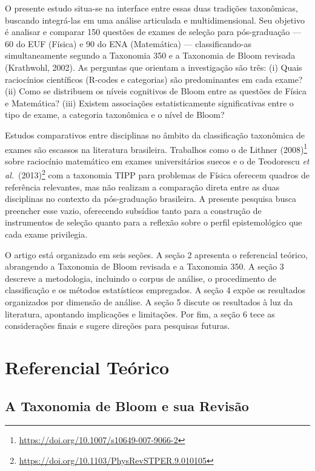 \documentclass[
  12pt,
  a4paper,
  twoside,
  brazilian
]{article}
\begin{document}
O presente estudo situa-se na interface entre essas duas tradições
taxonômicas, buscando integrá-las em uma análise articulada e
multidimensional. Seu objetivo é analisar e comparar 150 questões de
exames de seleção para pós-graduação --- 60 do EUF (Física) e 90 do ENA
(Matemática) --- classificando-as simultaneamente segundo a Taxonomia
350 e a Taxonomia de Bloom revisada (Krathwohl, 2002). As perguntas que
orientam a investigação são três: (i) Quais raciocínios científicos
(R-codes e categorias) são predominantes em cada exame? (ii) Como se
distribuem os níveis cognitivos de Bloom entre as questões de Física e
Matemática? (iii) Existem associações estatisticamente significativas
entre o tipo de exame, a categoria taxonômica e o nível de Bloom?

Estudos comparativos entre disciplinas no âmbito da classificação
taxonômica de exames são escassos na literatura brasileira. Trabalhos
como o de Lithner (2008)\footnote{\url{https://doi.org/10.1007/s10649-007-9066-2}} sobre raciocínio matemático em exames
universitários suecos e o de Teodorescu \textit{et al.}~(2013)\footnote{\url{https://doi.org/10.1103/PhysRevSTPER.9.010105}} com a taxonomia
TIPP para problemas de Física oferecem quadros de referência relevantes,
mas não realizam a comparação direta entre as duas disciplinas no
contexto da pós-graduação brasileira. A presente pesquisa busca
preencher esse vazio, oferecendo subsídios tanto para a construção de
instrumentos de seleção quanto para a reflexão sobre o perfil
epistemológico que cada exame privilegia.

O artigo está organizado em seis seções. A seção 2 apresenta o
referencial teórico, abrangendo a Taxonomia de Bloom revisada e a
Taxonomia 350. A seção 3 descreve a metodologia, incluindo o corpus de
análise, o procedimento de classificação e os métodos estatísticos
empregados. A seção 4 expõe os resultados organizados por dimensão de
análise. A seção 5 discute os resultados à luz da literatura, apontando
implicações e limitações. Por fim, a seção 6 tece as considerações
finais e sugere direções para pesquisas futuras.

\newpage
\section{Referencial Teórico}\label{referencial-teuxf3rico}

\subsection{A Taxonomia de Bloom e sua
Revisão}\label{a-taxonomia-de-bloom-e-sua-revisuxe3o}
\end{document}
